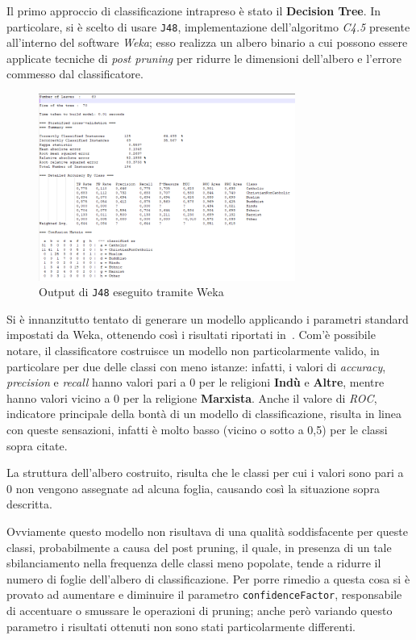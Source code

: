 \documentclass[a4paper,11pt,twoside,notitlepage,final]{scrartcl}
\begin{document}
Il primo approccio di classificazione intrapreso è stato il \textbf{Decision Tree}.
In particolare, si è scelto di usare \texttt{J48}, implementazione dell'algoritmo \emph{C4.5} presente all'interno del software \emph{Weka};
esso realizza un albero binario a cui possono essere applicate tecniche di \emph{post pruning}
per ridurre le dimensioni dell'albero e l'errore commesso dal classificatore.

\begin{figure}[H]
  \centering
  \includegraphics[width=0.75\textwidth]{fig/DecisionTree1.PNG}%
  \caption{Output di \texttt{J48} eseguito tramite Weka}%
  \label{fig:j48}
\end{figure}

Si è innanzitutto tentato di generare un modello applicando i parametri standard impostati da Weka, ottenendo così i risultati riportati in~.
Com'è possibile notare, il classificatore costruisce un modello non particolarmente valido, in particolare per due delle classi con meno istanze:
infatti, i valori di \emph{accuracy}, \emph{precision} e \emph{recall} hanno valori pari a \(0\) per le religioni \textbf{Indù} e \textbf{Altre}, mentre hanno valori vicino a \(0\) per la religione \textbf{Marxista}.
Anche il valore di \emph{ROC}, indicatore principale della bontà di un modello di classificazione, risulta in linea con queste sensazioni, infatti è molto basso (vicino o sotto a 0,5) per le classi sopra citate.

La struttura dell'albero costruito, risulta che le classi per cui i valori sono pari a \(0\) non vengono assegnate ad alcuna foglia, causando
così la situazione sopra descritta.

Ovviamente questo modello non risultava di una qualità soddisfacente per queste classi, probabilmente a causa del post pruning,
il quale, in presenza di un tale sbilanciamento nella frequenza delle classi meno popolate, tende a ridurre il numero di foglie dell'albero di classificazione.
Per porre rimedio a questa cosa si è provato ad aumentare e diminuire il parametro \texttt{confidenceFactor}, responsabile di accentuare o smussare le operazioni di pruning;
anche però variando questo parametro i risultati ottenuti non sono stati particolarmente differenti.
\end{document}
